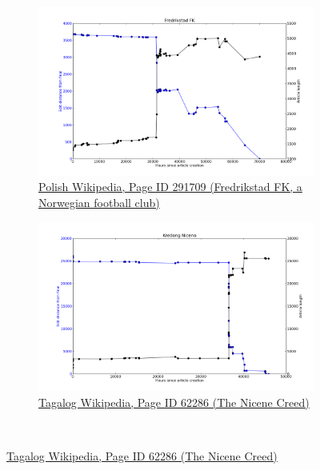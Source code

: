 \begin{figure}
{\begin{subfigure}[b!]{0.6\linewidth}
      \centering
      \includegraphics[width=\linewidth]{img/traj-classic/pl291709traj.png}
      \caption{\href{http://pl.wikipedia.org/wiki/index.php?curid=291709}{Polish
          Wikipedia, Page ID 291709 (Fredrikstad FK, a Norwegian
          football club)}}
      \label{fig:fredrikstad}
    \end{subfigure}
    \begin{subfigure}[b!]{0.6\linewidth}
      \centering
      \includegraphics[width=\linewidth]{img/traj-classic/tl62286traj.png}
      \caption{\href{http://tl.wikipedia.org/wiki/index.php?curid=62286}{Tagalog
          Wikipedia, Page ID 62286 (The Nicene Creed)}}
      \label{fig:nicine-creed}
    \end{subfigure}
  }\\
\end{figure}
